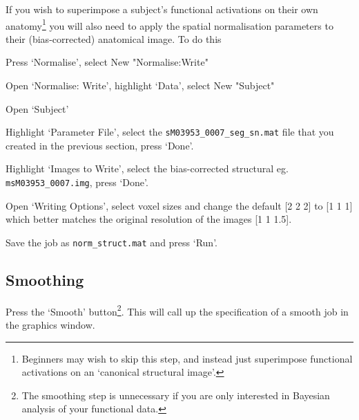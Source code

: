 If you wish to superimpose a subject's functional activations on their own anatomy\footnote{Beginners may wish to skip this step, and instead just superimpose functional activations on an `canonical structural image'.} you will also need to 
apply the spatial normalisation parameters to their 
(bias-corrected) anatomical image. To do this
\bi
\item{Press `Normalise', select New "Normalise:Write"}
\item{Open `Normalise: Write', highlight `Data', select 
New "Subject"}
\item{Open `Subject'}
\item{Highlight `Parameter File', select the  \verb!sM03953_0007_seg_sn.mat! file that you 
created in the previous section, press `Done'.}
\item{Highlight `Images to Write', select the 
bias-corrected structural eg. \verb!msM03953_0007.img!, press `Done'.}
\item{Open `Writing Options', select voxel sizes and 
change the default [2 2 2] to [1 1 1] which better matches the original resolution of the images [1 1 1.5].}
\item{Save the job as \verb!norm_struct.mat! and press `Run'}.
\ei

\subsection{Smoothing}

Press the `Smooth' button\footnote{The smoothing step is unnecessary if you are only interested in Bayesian analysis of your functional data.}. This will call up the specification of a smooth job in the graphics 
window.


